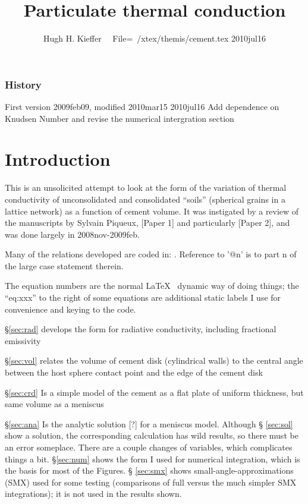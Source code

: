 \documentclass{article}
\title{Particulate thermal conduction}
\author{Hugh H. Kieffer  \ \ File=~/xtex/themis/cement.tex 2010jul16}
\begin{document}
\maketitle
\tableofcontents
\subsubsection{History}
First version 2009feb09, modified 2010mar15
\qi 2010jul16 Add dependence on Knudsen Number and revise the numerical intergration section

 \section{Introduction}

This is an unsolicited attempt to look at the form of the variation of thermal
conductivity of unconsolidated and consolidated ``soils'' (spherical grains in a
lattice network) as a function of cement volume. It was instigated by a review
of the manuscripts by Sylvain Piqueux, \cite{Piqueux09a} [Paper 1] and
particularly \cite{Piqueux09b} [Paper 2], and was done largely in
2008nov-2009feb.

Many of the relations developed are coded in:
. Reference to '@n' is to part n of the large
case statement therein.

The equation numbers are the normal \LaTeX~ dynamic way of doing things; the
``eq:xxx'' to the right of some equations are additional static labels I use for
convenience and keying to the code.

\S \ref{sec:rad} develops the form for radiative conductivity, including fractional emissivity

\S \ref{sec:vol} relates the volume of cement disk (cylindrical walls) to the central angle between the host sphere contact point and the edge of the cement disk

\S \ref{sec:crd} Is a simple model of the cement as a flat plate of uniform
thickness, but same volume as a meniscus

\S \ref{sec:ana} Is the analytic solution [?] for a meniscus model. Although \S
\ref{sec:sol} show a solution, the corresponding calculation has wild results,
so there must be an error someplace. There are a couple changes of variables,
which complicates things a bit. \S \ref{sec:num} shows the form I used for
numerical integration, which is the basis for most of the Figures. \S
\ref{sec:smx} shows small-angle-approximations (SMX) used for some testing
(comparisons of full versus the much simpler SMX integrations); it is not used
in the results shown.
\end{document}
